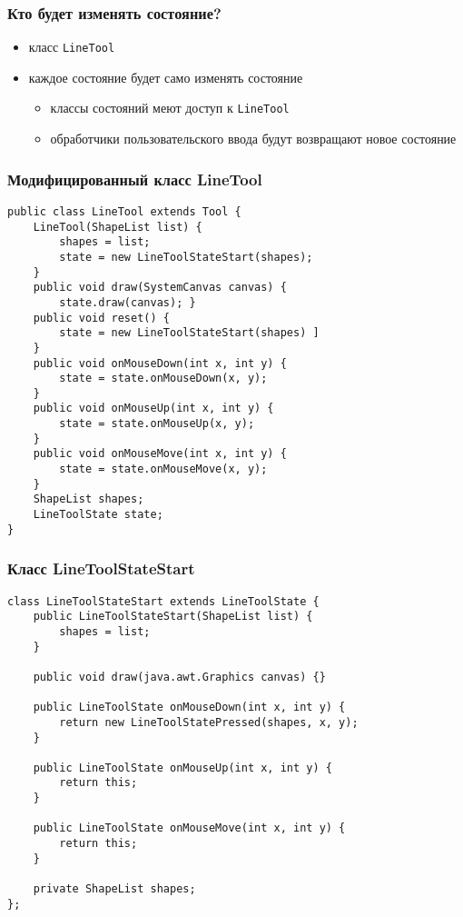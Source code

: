 \documentclass[handout]{beamer}
\begin{document}
\begin{frame}[fragile]
\frametitle{Кто будет изменять состояние?}
\begin{itemize}
\item класс \lstinline{LineTool}
\item каждое состояние будет само изменять состояние
    \begin{itemize}
    \item классы состояний меют доступ к \lstinline{LineTool}
    \item обработчики пользовательского ввода будут возвращают
          новое состояние
    \end{itemize}
\end{itemize}
\end{frame}


\begin{frame}[fragile]
\frametitle{Модифицированный класс LineTool}
\begin{lstlisting}
public class LineTool extends Tool {
    LineTool(ShapeList list) {
        shapes = list;
        state = new LineToolStateStart(shapes);
    }
    public void draw(SystemCanvas canvas) {
        state.draw(canvas); }
    public void reset() {
        state = new LineToolStateStart(shapes) ]
    }
    public void onMouseDown(int x, int y) {
        state = state.onMouseDown(x, y);
    }
    public void onMouseUp(int x, int y) {
        state = state.onMouseUp(x, y);
    }
    public void onMouseMove(int x, int y) {
        state = state.onMouseMove(x, y);
    }
    ShapeList shapes;
    LineToolState state;
}
\end{lstlisting}
\end{frame}


\begin{frame}[fragile]
\frametitle{Класс LineToolStateStart}
\begin{lstlisting}
class LineToolStateStart extends LineToolState {
    public LineToolStateStart(ShapeList list) {
        shapes = list;
    }

    public void draw(java.awt.Graphics canvas) {}

    public LineToolState onMouseDown(int x, int y) {
        return new LineToolStatePressed(shapes, x, y);
    }

    public LineToolState onMouseUp(int x, int y) {
    	return this;
    }
    
    public LineToolState onMouseMove(int x, int y) {
        return this;
    }

    private ShapeList shapes;
};
\end{lstlisting}
\end{frame}
\end{document}
